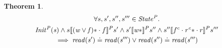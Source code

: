 \documentclass[a4paper,11pt]{article}
\newtheorem{theorem}{Theorem}[section]
\newtheorem{lemma}[theorem]{Lemma}
\theoremstyle{definition}
\newtheorem{definition}[theorem]{Definition}
\begin{document}
\begin{theorem}
\begin{multline*}
      \forall s, s', s'', s''' \in \mathit{State^P} \ldotp\\\mathit{Init^P(s)} \land s \llbracket \mathit{(w \lor f)\ast} \cdot f \rrbracket^P s' \land
      s' \llbracket \mathit{w\ast} \rrbracket^P s'' \land
      s'' \llbracket f^c \cdot \mathit{r^c\ast} \cdot r \rrbracket^P s'''\\
      \implies \mathit{read(s')} \doteq \mathit{read(s''')} \lor \mathit{read(s'')} \doteq \mathit{read(s''')}
\end{multline*}
\end{theorem}

\end{document}
